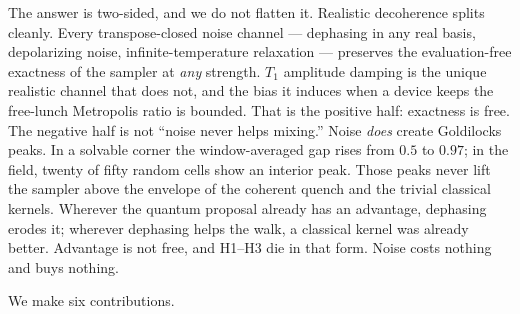 \documentclass[aps,prx,reprint,floatfix,amsmath,amssymb,amsfonts]{revtex4-2}
\begin{document}
The answer is two-sided, and we do not flatten it. Realistic decoherence
splits cleanly. Every transpose-closed noise channel --- dephasing in
any real basis, depolarizing noise, infinite-temperature relaxation ---
preserves the evaluation-free exactness of the sampler at \emph{any}
strength. $T_1$ amplitude damping is the unique realistic channel that
does not, and the bias it induces when a device keeps the free-lunch
Metropolis ratio is bounded. That is the positive half: exactness is
free. The negative half is not ``noise never helps mixing.'' Noise
\emph{does} create Goldilocks peaks. In a solvable corner the
window-averaged gap rises from $0.5$ to $0.97$; in the field, twenty of
fifty random cells show an interior peak. Those peaks never lift the
sampler above the envelope of the coherent quench and the trivial
classical kernels. Wherever the quantum proposal already has an
advantage, dephasing erodes it; wherever dephasing helps the walk, a
classical kernel was already better. Advantage is not free, and H1--H3
die in that form. Noise costs nothing and buys nothing.

We make six contributions.
\end{document}
